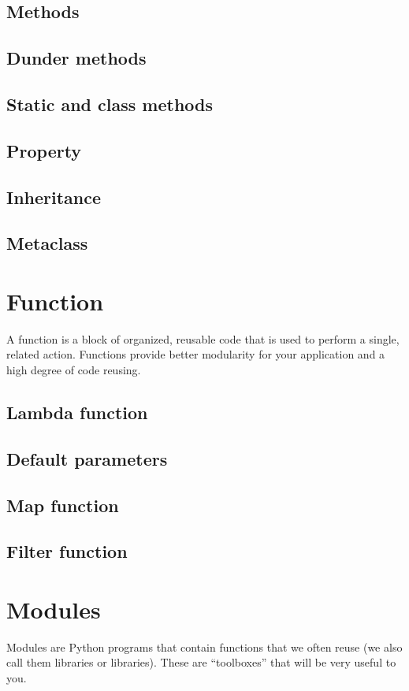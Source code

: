 \documentclass[a4paper, 12pt]{article}
\begin{document}
\subsection{Methods}
\subsection{Dunder methods}
\subsection{Static and class methods}
\subsection{Property}
\subsection{Inheritance}
\subsection{Metaclass}

\newpage
\section{Function}
A function is a block of organized, reusable code that is used to perform a single, related action. Functions provide better modularity for your application and a high degree of code reusing.\newline
\subsection{Lambda function}
\subsection{Default parameters}
\subsection{Map function}
\subsection{Filter function}

\newpage
\section{Modules}
Modules are Python programs that contain functions that we often reuse (we also call them libraries or libraries). These are “toolboxes” that will be very useful to you.\newline
\end{document}
